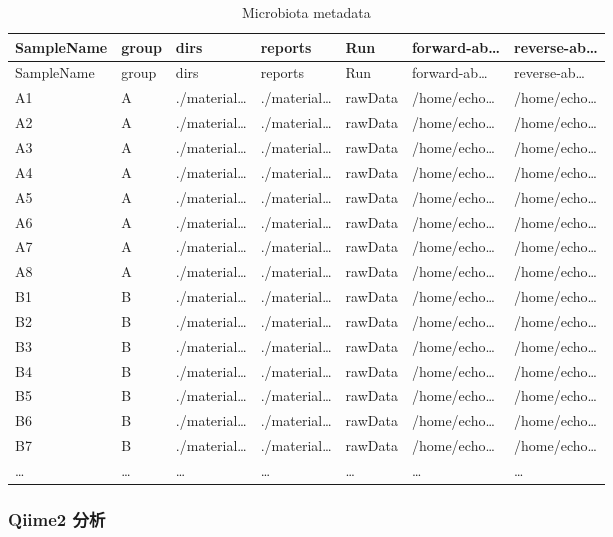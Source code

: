 \documentclass[
]{article}
\begin{document}
\begin{longtable}[]{@{}lllllll@{}}
\caption{\label{tab:microbiota-metadata}Microbiota metadata}\tabularnewline
\toprule
SampleName & group & dirs & reports & Run & forward-ab\ldots{} & reverse-ab\ldots{}\tabularnewline
\midrule
\endfirsthead
\toprule
SampleName & group & dirs & reports & Run & forward-ab\ldots{} & reverse-ab\ldots{}\tabularnewline
\midrule
\endhead
A1 & A & ./material\ldots{} & ./material\ldots{} & rawData & /home/echo\ldots{} & /home/echo\ldots{}\tabularnewline
A2 & A & ./material\ldots{} & ./material\ldots{} & rawData & /home/echo\ldots{} & /home/echo\ldots{}\tabularnewline
A3 & A & ./material\ldots{} & ./material\ldots{} & rawData & /home/echo\ldots{} & /home/echo\ldots{}\tabularnewline
A4 & A & ./material\ldots{} & ./material\ldots{} & rawData & /home/echo\ldots{} & /home/echo\ldots{}\tabularnewline
A5 & A & ./material\ldots{} & ./material\ldots{} & rawData & /home/echo\ldots{} & /home/echo\ldots{}\tabularnewline
A6 & A & ./material\ldots{} & ./material\ldots{} & rawData & /home/echo\ldots{} & /home/echo\ldots{}\tabularnewline
A7 & A & ./material\ldots{} & ./material\ldots{} & rawData & /home/echo\ldots{} & /home/echo\ldots{}\tabularnewline
A8 & A & ./material\ldots{} & ./material\ldots{} & rawData & /home/echo\ldots{} & /home/echo\ldots{}\tabularnewline
B1 & B & ./material\ldots{} & ./material\ldots{} & rawData & /home/echo\ldots{} & /home/echo\ldots{}\tabularnewline
B2 & B & ./material\ldots{} & ./material\ldots{} & rawData & /home/echo\ldots{} & /home/echo\ldots{}\tabularnewline
B3 & B & ./material\ldots{} & ./material\ldots{} & rawData & /home/echo\ldots{} & /home/echo\ldots{}\tabularnewline
B4 & B & ./material\ldots{} & ./material\ldots{} & rawData & /home/echo\ldots{} & /home/echo\ldots{}\tabularnewline
B5 & B & ./material\ldots{} & ./material\ldots{} & rawData & /home/echo\ldots{} & /home/echo\ldots{}\tabularnewline
B6 & B & ./material\ldots{} & ./material\ldots{} & rawData & /home/echo\ldots{} & /home/echo\ldots{}\tabularnewline
B7 & B & ./material\ldots{} & ./material\ldots{} & rawData & /home/echo\ldots{} & /home/echo\ldots{}\tabularnewline
\ldots{} & \ldots{} & \ldots{} & \ldots{} & \ldots{} & \ldots{} & \ldots{}\tabularnewline
\bottomrule
\end{longtable}

\hypertarget{qiime2-ux5206ux6790}{%
\subsubsection{Qiime2 分析}\label{qiime2-ux5206ux6790}}
\end{document}
